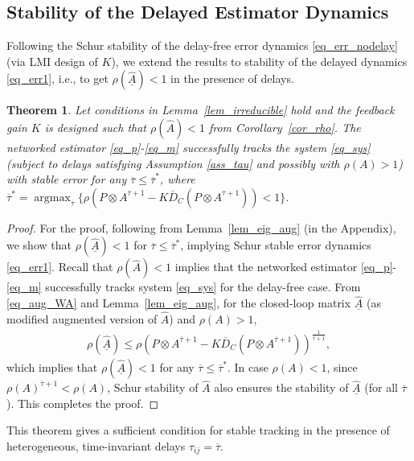 \documentclass[journal]{IEEEtran}
\newtheorem{thm}{Theorem}
\DeclareMathOperator*{\argmax}{argmax}
\begin{document}
\subsection{Stability of the Delayed Estimator Dynamics}
Following the Schur stability of the delay-free error dynamics \eqref{eq_err_nodelay}  (via LMI design of  $K$), we extend the results to stability of the delayed dynamics \eqref{eq_err1}, i.e., to get  $\rho(\underline{\widehat{A}})<1$ in the presence of  delays.
\begin{thm} \label{thm_tau*}
	Let conditions in Lemma~\ref{lem_irreducible} hold and the feedback gain $K$ is designed such that $\rho({\widehat{A}})<1$ from Corollary~\ref{cor_rho}. The networked estimator \eqref{eq_p}-\eqref{eq_m}  successfully tracks the system \eqref{eq_sys} (subject to delays satisfying Assumption \ref{ass_tau} and possibly with $\rho({A})>1$) with stable error for any $\overline{\tau}\leq \overline{\tau}^*$, where $\overline{\tau}^* = \argmax_{\overline{\tau}} %
	\{\rho(P\otimes A^{\overline{\tau}+1} - K \overline{D}_C (P\otimes A^{\overline{\tau}+1}) )< 1\}$.
\end{thm}
\begin{proof}
	For the proof, following from Lemma~\ref{lem_eig_aug} (in the Appendix), we show that $\rho(\underline{\widehat{A}})<1$ for $\overline{\tau}\leq \overline{\tau}^*$, implying Schur stable error dynamics \eqref{eq_err1}. Recall that $\rho({\widehat{A}})<1$ implies that the networked estimator \eqref{eq_p}-\eqref{eq_m}  successfully tracks  system  \eqref{eq_sys} for the delay-free case. From \eqref{eq_aug_WA} and Lemma~\ref{lem_eig_aug}, for the closed-loop matrix $\underline{\widehat{A}}$ (as modified augmented version of ${\widehat{A}}$) and $\rho({A})>1$, 
	\begin{align} \label{eq_tau*}
	    \rho(\underline{\widehat{A}})\leq \rho(P\otimes A^{\overline{\tau}+1} - K \overline{D}_C (P\otimes A^{\overline{\tau}+1}) )^{\frac{1}{\overline{\tau}+1}},
	\end{align}
	which implies that $\rho(\underline{\widehat{A}})<1$ for any $\overline{\tau}\leq \overline{\tau}^*$. In case $\rho({A})<1$, since  $\rho({A})^{\overline{\tau}+1}<\rho({A})$, Schur stability of $\widehat{A}$ also ensures the stability of $\underline{\widehat{A}}$ (for all $\overline{\tau}$). This completes the proof.
\end{proof}	
This theorem gives a sufficient condition for  stable tracking in the presence of  heterogeneous, time-invariant delays $\tau_{ij} = \overline{\tau}$.
\end{document}
